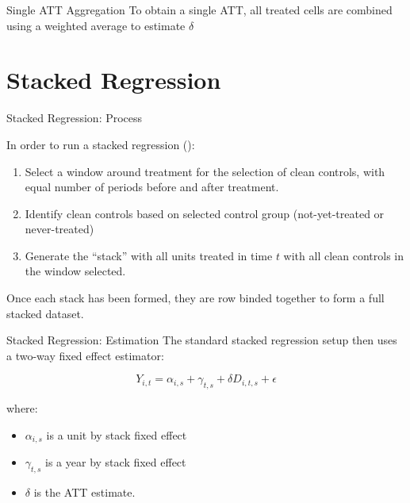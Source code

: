 \documentclass[11pt]{beamer}
\begin{document}
\begin{frame}{Single ATT Aggregation}
    To obtain a single ATT, all treated cells are combined using a weighted average to estimate $\delta$

    
\end{frame}




\section{Stacked Regression}

\begin{frame}{Stacked Regression: Process}

In order to run a stacked regression (\cite{cengiz2019effect}):

\begin{enumerate}
    \item Select a window around treatment for the selection of clean controls, with equal number of periods before and after treatment.
    \item Identify clean controls based on selected control group (not-yet-treated or never-treated)
    \item Generate the ``stack'' with all units treated in time $t$ with all clean controls in the window selected.
\end{enumerate}

Once each stack has been formed, they are row binded together to form a full stacked dataset.
    
\end{frame}

\begin{frame}[label=stacked_est]{Stacked Regression: Estimation}
    The standard stacked regression setup then uses a two-way fixed effect estimator:

    \begin{equation}
        Y_{i,t} = \alpha_{i,s} + \gamma_{t,s} + \delta D_{i,t,s} + \epsilon
    \end{equation}

    where: 
    
    \begin{itemize}
        \item $\alpha_{i,s}$ is a unit by stack fixed effect
        \item $\gamma_{t,s}$ is a year by stack fixed effect
        \item $\delta$ is the ATT estimate.
    \end{itemize}

    \vfill
    \hfill\hyperlink{stack_decomp}{}
\end{frame}
\end{document}
